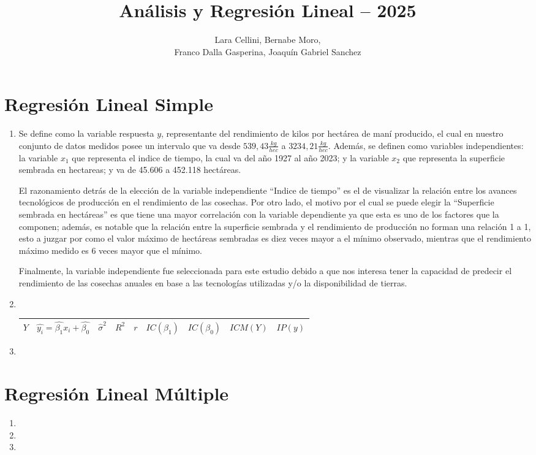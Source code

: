 \documentclass[spanish,12pt,a4paper]{article}
\title{Análisis y Regresión Lineal – 2025}
\author{Lara Cellini, Bernabe Moro,\\Franco Dalla Gasperina, Joaquín Gabriel Sanchez}
\begin{document}
	
	\maketitle
	
	\section{Regresión Lineal Simple}
	
	\begin{enumerate}[label=\alph*)]
		\item Se define como la variable respuesta $y$, representante del rendimiento de kilos por hectárea de maní producido, el cual en nuestro conjunto de datos medidos posee un intervalo que va desde $539,43 \frac{kg}{hec}$ a $3234,21 \frac{kg}{hec}$. Además, se definen como variables independientes: la variable $x_1$ que representa el indice de tiempo, la cual va del año 1927 al año 2023; y la variable $x_2$ que representa la superficie sembrada en hectareas; y va de 45.606 a 452.118 hectáreas.
		
		El razonamiento detrás de la elección de la variable independiente ``Indice de tiempo'' es el de visualizar la relación entre los avances tecnológicos de producción en el rendimiento de las cosechas. Por otro lado, el motivo por el cual se puede elegir la ``Superficie sembrada en hectáreas'' es que tiene una mayor correlación con la variable dependiente ya que esta es uno de los factores que la componen; además, es notable que la relación entre la superficie sembrada y el rendimiento de producción no forman una relación 1 a 1, esto a juzgar por como el valor máximo de hectáreas sembradas es diez veces mayor a el mínimo observado, mientras que el rendimiento máximo medido es 6 veces mayor que el mínimo.
		
		Finalmente, la variable independiente fue seleccionada para este estudio debido a que nos interesa tener la capacidad de predecir el rendimiento de las cosechas anuales en base a las tecnologías utilizadas y/o la disponibilidad de tierras.
		
		\item ~
		\begin{table}[h!]
			\centering
			\bgroup
			\def\arraystretch{1.5}
			\begin{tabular}{|c|c|c|c|c|c|c|c|c|}\hline
				$Y$ & $\hat{y_i} = \hat{\beta_1}x_i+\hat{\beta_0}$ & $\hat{\sigma}^2$ & $R^2$ & $r$ & $IC(\beta_1)$ & $IC(\beta_0)$ & $ICM(Y)$ & $IP(y)$\\\hline
			\end{tabular}
			\egroup
		\end{table}
		\item
	\end{enumerate}
	
	\section{Regresión Lineal Múltiple}
	
	\begin{enumerate}[label=\alph*)]
		\item 
		\item 
		\item
	\end{enumerate}
\end{document}
